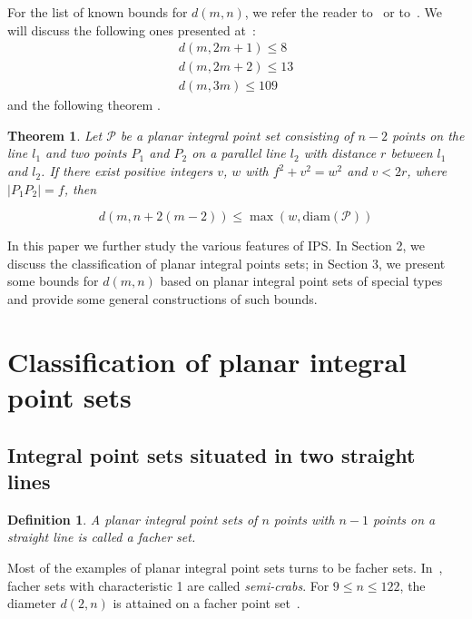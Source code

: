 \documentclass[12pt]{article}
\theoremstyle{theorem}
\newtheorem{theorem}{Theorem}
\theoremstyle{dfn}
\newtheorem{dfn}{Definition}
\theoremstyle{remark}
\begin{document}
For the list of known bounds for $d(m, n)$,
we refer the reader to~\cite[Theorem 1]{kurz2008bounds} or to~\cite{our-vmmsh-2018}.
We will discuss the following ones presented at~\cite{kurz2008bounds}:
\begin{align}
	d(m, 2m + 1) \leq 8\\
	d(m, 2m + 2) \leq 13 \label{eq:d_m_2m+2}\\
	d(m, 3m) \leq 109
\end{align}
and the following theorem \cite[Theorem 2.1]{kurz2008bounds}.

\begin{theorem}
	\label{thm:Kurz_blowup}
	Let $\mathcal{P}$ be a planar integral point set consisting of
	$n - 2$ points on the line $l_1$ and two points $P_{1}$ and $P_{2}$ on a
	parallel line $l_2$ with distance $r$ between $l_{1}$ and $l_{2}$. If there
	exist positive integers $v$, $w$ with $f^{2} + v^{2}
	= w^{2}$ and $v < 2r$, where $|P_{1}P_{2}| = f$,
	then

	\begin{equation}\label{formula1}
		d(m, n + 2(m - 2)) \leq \max(w, \operatorname{diam(\mathcal{P})})
	\end{equation}

\end{theorem}

In this paper we further study the various features of IPS.
In Section 2, we discuss the classification of planar integral points sets;
in Section 3, we present some bounds for $d(m,n)$ based on planar integral point sets of special types
and provide some general constructions of such bounds.

\section{Classification of planar integral point sets}

\subsection{Integral point sets situated in two straight lines}

\begin{dfn}
	A planar integral point sets of $n$ points with $n-1$ points on a straight line is called
	a \textit{facher} set.
\end{dfn}
Most of the examples of planar integral point sets turns to be facher sets.
In~\cite{antonov2008maximal}, facher sets with characteristic 1 are called \textit{semi-crabs}.
For $9 \leq n \leq 122$, the diameter $d(2,n)$ is attained on a facher point set~\cite{kurz2008minimum}.
\end{document}
